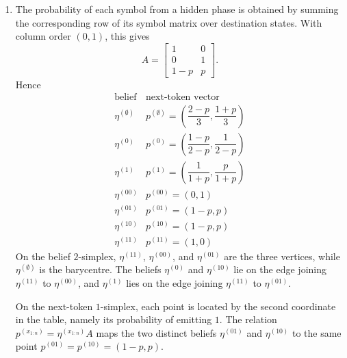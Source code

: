 \begin{solution}[ex:p3-2]
\begin{enumerate}
\begin{enumerate}
          \item The generator has access to its actual hidden phase and needs
            only the three states $0$, $1$, and $R$. An observer begins with
            an unknown phase and must also represent four transient posterior
            distributions before synchronising with the generator. This
            example therefore shows that inference can require a richer state
            description than a particular generative presentation.
        \end{enumerate}

      \item The probability of each symbol from a hidden phase is obtained by
        summing the corresponding row of its symbol matrix over destination
        states. With column order $(0,1)$, this gives
        \[
          A=
          \begin{bmatrix}
            1&0\\
            0&1\\
            1-p&p
          \end{bmatrix}.
        \]
        Hence
        \[
          \begin{array}{c|c}
            \text{belief} & \text{next-token vector}\\
            \hline
            \eta^{(\emptyset)} &
              p^{(\emptyset)}=
              \left(\dfrac{2-p}{3},\dfrac{1+p}{3}\right)\\[1mm]
            \eta^{(0)} &
              p^{(0)}=
              \left(\dfrac{1-p}{2-p},\dfrac{1}{2-p}\right)\\[1mm]
            \eta^{(1)} &
              p^{(1)}=
              \left(\dfrac{1}{1+p},\dfrac{p}{1+p}\right)\\[1mm]
            \eta^{(00)} & p^{(00)}=(0,1)\\
            \eta^{(01)} & p^{(01)}=(1-p,p)\\
            \eta^{(10)} & p^{(10)}=(1-p,p)\\
            \eta^{(11)} & p^{(11)}=(1,0)
          \end{array}
        \]
        On the belief $2$-simplex, $\eta^{(11)}$, $\eta^{(00)}$, and
        $\eta^{(01)}$ are the three vertices, while
        $\eta^{(\emptyset)}$ is the barycentre. The beliefs $\eta^{(0)}$ and
        $\eta^{(10)}$ lie on the edge joining $\eta^{(11)}$ to
        $\eta^{(00)}$, and $\eta^{(1)}$ lies on the edge joining
        $\eta^{(11)}$ to $\eta^{(01)}$.

        On the next-token $1$-simplex, each point is located by the second
        coordinate in the table, namely its probability of emitting $1$.
        The relation $p^{(x_{1:n})}=\eta^{(x_{1:n})}A$ maps the two distinct
        beliefs $\eta^{(01)}$ and $\eta^{(10)}$ to the same point
        $p^{(01)}=p^{(10)}=(1-p,p)$.


\end{enumerate}
\end{solution}
